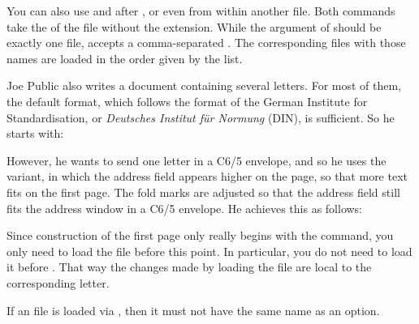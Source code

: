 You can also use  and  after
, or even from within another 
file. Both commands take the  of the  file without the
extension. While the argument of  should be exactly
one  file,  accepts a comma-separated
. The corresponding  files with those names are
loaded in the order given by the list.
\begin{Example}
  Joe Public also writes a document containing several letters. For most of
  them, the default format, which follows the format of the German Institute
  for Standardisation, or \emph{Deutsches Institut f\"{u}r Normung} (DIN), is
  sufficient. So he starts with:
  However, he wants to send one letter in a C6/5 envelope, and so he
  uses the  variant, in which the
  address field appears higher on the page, so that more text
  fits on the first page. The fold marks are adjusted so that the
  address field still fits the address window in a C6/5 envelope.
  He achieves this as follows:
  Since construction of the first page only really begins with the
   command, you only need to
  load the  file before this point. In particular, you do not need
  to load it before . That way the changes
  made by loading the  file are local to the corresponding letter.
\end{Example}

If an  file is loaded via
, then it must not have the same name as an option.

